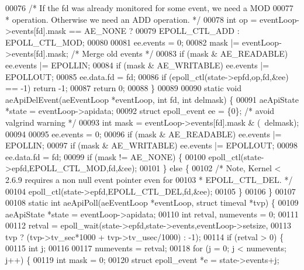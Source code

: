 \begin{DoxyCode}
00076     \textcolor{comment}{/* If the fd was already monitored for some event, we need a MOD}
00077 \textcolor{comment}{     * operation. Otherwise we need an ADD operation. */}
00078     \textcolor{keywordtype}{int} op = eventLoop->events[fd].mask == AE\_NONE ?
00079             EPOLL\_CTL\_ADD : EPOLL\_CTL\_MOD;
00080 
00081     ee.events = 0;
00082     mask |= eventLoop->events[fd].mask; \textcolor{comment}{/* Merge old events */}
00083     \textcolor{keywordflow}{if} (mask & AE\_READABLE) ee.events |= EPOLLIN;
00084     \textcolor{keywordflow}{if} (mask & AE\_WRITABLE) ee.events |= EPOLLOUT;
00085     ee.data.fd = fd;
00086     \textcolor{keywordflow}{if} (epoll\_ctl(state->epfd,op,fd,&ee) == -1) \textcolor{keywordflow}{return} -1;
00087     \textcolor{keywordflow}{return} 0;
00088 \}
00089 
00090 \textcolor{keyword}{static} \textcolor{keywordtype}{void} aeApiDelEvent(aeEventLoop *eventLoop, \textcolor{keywordtype}{int} fd, \textcolor{keywordtype}{int} delmask) \{
00091     aeApiState *state = eventLoop->apidata;
00092     \textcolor{keyword}{struct} epoll\_event ee = \{0\}; \textcolor{comment}{/* avoid valgrind warning */}
00093     \textcolor{keywordtype}{int} mask = eventLoop->events[fd].mask & (~delmask);
00094 
00095     ee.events = 0;
00096     \textcolor{keywordflow}{if} (mask & AE\_READABLE) ee.events |= EPOLLIN;
00097     \textcolor{keywordflow}{if} (mask & AE\_WRITABLE) ee.events |= EPOLLOUT;
00098     ee.data.fd = fd;
00099     \textcolor{keywordflow}{if} (mask != AE\_NONE) \{
00100         epoll\_ctl(state->epfd,EPOLL\_CTL\_MOD,fd,&ee);
00101     \} \textcolor{keywordflow}{else} \{
00102         \textcolor{comment}{/* Note, Kernel < 2.6.9 requires a non null event pointer even for}
00103 \textcolor{comment}{         * EPOLL\_CTL\_DEL. */}
00104         epoll\_ctl(state->epfd,EPOLL\_CTL\_DEL,fd,&ee);
00105     \}
00106 \}
00107 
00108 \textcolor{keyword}{static} \textcolor{keywordtype}{int} aeApiPoll(aeEventLoop *eventLoop, \textcolor{keyword}{struct} timeval *tvp) \{
00109     aeApiState *state = eventLoop->apidata;
00110     \textcolor{keywordtype}{int} retval, numevents = 0;
00111 
00112     retval = epoll\_wait(state->epfd,state->events,eventLoop->setsize,
00113             tvp ? (tvp->tv\_sec*1000 + tvp->tv\_usec/1000) : -1);
00114     \textcolor{keywordflow}{if} (retval > 0) \{
00115         \textcolor{keywordtype}{int} j;
00116 
00117         numevents = retval;
00118         \textcolor{keywordflow}{for} (j = 0; j < numevents; j++) \{
00119             \textcolor{keywordtype}{int} mask = 0;
00120             \textcolor{keyword}{struct} epoll\_event *e = state->events+j;

\end{DoxyCode}
